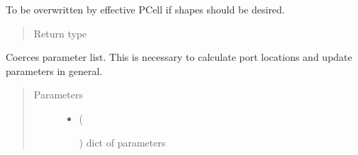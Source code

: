 \documentclass[a4paper,10pt,english]{sphinxmanual}
\begin{document}
\begin{fulllineitems}
\begin{fulllineitems}
\begin{quote}
\begin{description}
\begin{itemize}
\end{itemize}

\end{description}\end{quote}

\end{fulllineitems}


\begin{fulllineitems}
\label{\detokenize{photonics/photonics:kppc.photonics.PhotDevice.shapes}}
To be overwritten by effective PCell if shapes should be desired.
\begin{quote}\begin{description}
\item[{Return type}] \leavevmode
{}%
\begin{footnote}[63]\sphinxAtStartFootnote
{}
%
\end{footnote}

\end{description}\end{quote}

\end{fulllineitems}


\begin{fulllineitems}
\label{\detokenize{photonics/photonics:kppc.photonics.PhotDevice.update_parameter_list}}
Coerces parameter list. This is necessary to calculate port locations and update parameters in general.
\begin{quote}\begin{description}
\item[{Parameters}] \leavevmode\begin{itemize}
\item {} 
 (%
\begin{footnote}[64]\sphinxAtStartFootnote
{}
%
\end{footnote}) \textendash{} dict of parameters


\end{itemize}
\end{description}
\end{quote}
\end{fulllineitems}
\end{fulllineitems}
\end{document}
